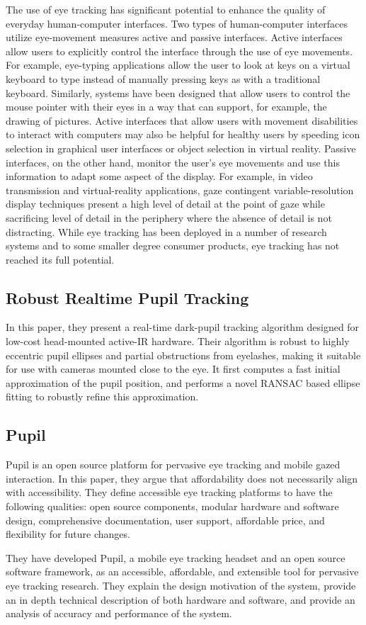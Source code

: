 The use of eye tracking has significant potential to enhance the quality of everyday human-computer interfaces. Two types of human-computer interfaces utilize eye-movement measures active and passive interfaces. Active interfaces allow users to explicitly control the interface through the use of eye movements. For example, eye-typing applications allow the user to look at keys on a virtual keyboard to type instead of manually pressing keys as with a traditional keyboard. Similarly, systems have been designed that allow users to control the mouse pointer with their eyes in a way that can support, for example, the drawing of pictures. Active interfaces that allow users with movement disabilities to interact with computers may also be helpful for healthy users by speeding icon selection in graphical user interfaces or object selection in virtual reality. Passive interfaces, on the other hand, monitor the user's eye movements and use this information to adapt some aspect of the display. For example, in video transmission and virtual-reality applications, gaze contingent variable-resolution display techniques present a high level of detail at the point of gaze while sacrificing level of detail in the periphery where the absence of detail is not distracting. While eye tracking has been deployed in a number of research systems and to some smaller degree consumer products, eye tracking has not reached its full potential.

\subsection{Robust Realtime Pupil Tracking}
In this paper, they present a real-time dark-pupil tracking algorithm designed for low-cost head-mounted active-IR hardware. Their algorithm is robust to highly eccentric pupil ellipses and partial obstructions from eyelashes, making it suitable for use with cameras mounted close to the eye. It first computes a fast initial approximation of the pupil position, and performs a novel RANSAC based ellipse fitting to robustly refine this approximation.

\subsection{Pupil}
Pupil is an open source platform for pervasive eye tracking and mobile gazed interaction. In this paper, they argue that affordability does not necessarily align with accessibility. They define accessible eye tracking platforms to have the following qualities: open source components, modular hardware and software design, comprehensive documentation, user support, affordable price, and flexibility for future changes. \bigskip

They have developed Pupil, a mobile eye tracking headset and an open source software framework, as an accessible, affordable, and extensible tool for pervasive eye tracking research. They explain the design motivation of the system, provide an in depth technical description of both hardware and software, and provide an analysis of accuracy and performance of the system.

